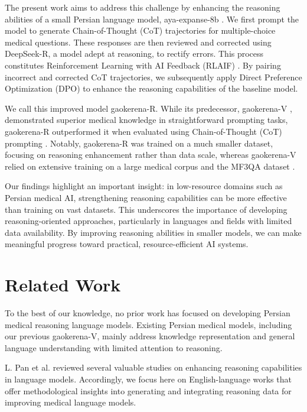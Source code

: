 \documentclass[conference]{IEEEtran}
\begin{document}
The present work aims to address this challenge by enhancing the reasoning abilities of a small Persian language model, aya-expanse-8b
\cite{b5}. We first prompt the model to generate Chain-of-Thought (CoT) trajectories for multiple-choice medical questions. These responses are then reviewed and corrected using DeepSeek-R, a model adept at reasoning, to rectify errors. This process constitutes Reinforcement Learning with AI Feedback (RLAIF)
\cite{b6}. By pairing incorrect and corrected CoT trajectories, we subsequently apply Direct Preference Optimization (DPO)
\cite{b7} to enhance the reasoning capabilities of the baseline model.

We call this improved model gaokerena-R. While its predecessor, gaokerena-V
\cite{b8}, demonstrated superior medical knowledge in straightforward prompting tasks, gaokerena-R outperformed it when evaluated using Chain-of-Thought (CoT) prompting
\cite{b9}. Notably, gaokerena-R was trained on a much smaller dataset, focusing on reasoning enhancement rather than data scale, whereas gaokerena-V relied on extensive training on a large medical corpus and the MF3QA dataset
\cite{b8}.

Our findings highlight an important insight: in low-resource domains such as Persian medical AI, strengthening reasoning capabilities can be more effective than training on vast datasets. This underscores the importance of developing reasoning-oriented approaches, particularly in languages and fields with limited data availability. By improving reasoning abilities in smaller models, we can make meaningful progress toward practical, resource-efficient AI systems.
	
	\section{Related Work}
To the best of our knowledge, no prior work has focused on developing Persian medical reasoning language models. Existing Persian medical models, including our previous gaokerena-V, mainly address knowledge representation and general language understanding with limited attention to reasoning.

 L. Pan et al. reviewed several valuable studies on enhancing reasoning capabilities in language models.
\cite{b10}
Accordingly, we focus here on English-language works that offer methodological insights into generating and integrating reasoning data for improving medical language models.
\end{document}
